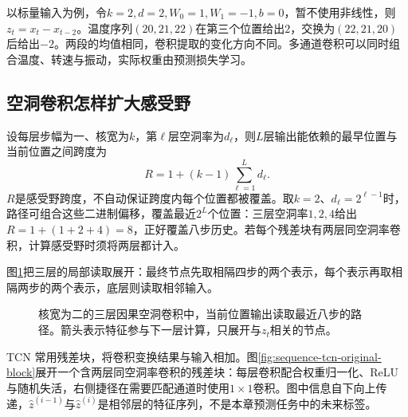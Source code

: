 以标量输入为例，令$k=2,d=2,W_0=1,W_1=-1,b=0$，暂不使用非线性，则$z_t=x_t-x_{t-2}$。温度序列$(20,21,22)$在第三个位置给出$2$，交换为$(22,21,20)$后给出$-2$。两段的均值相同，卷积提取的变化方向不同。多通道卷积可以同时组合温度、转速与振动，实际权重由预测损失学习。

\subsection{空洞卷积怎样扩大感受野}
设每层步幅为一、核宽为$k$，第$\ell$层空洞率为$d_\ell$，则$L$层输出能依赖的最早位置与当前位置之间跨度为
\begin{equation}
 R=1+(k-1)\sum_{\ell=1}^L d_\ell.
\end{equation}
$R$是感受野跨度，不自动保证跨度内每个位置都被覆盖。取$k=2$、$d_\ell=2^{\ell-1}$时，路径可组合这些二进制偏移，覆盖最近$2^L$个位置：三层空洞率$1,2,4$给出$R=1+(1+2+4)=8$，正好覆盖八步历史。若每个残差块有两层同空洞率卷积，计算感受野时须将两层都计入。

图\ref{fig:sequence-tcn-receptive}把三层的局部读取展开：最终节点先取相隔四步的两个表示，每个表示再取相隔两步的两个表示，底层则读取相邻输入。
\begin{figure}[htbp]
\centering
{}
\caption{核宽为二的三层因果空洞卷积中，当前位置输出读取最近八步的路径。箭头表示特征参与下一层计算，只展开与$z_t$相关的节点。}
\label{fig:sequence-tcn-receptive}
\end{figure}

TCN 常用残差块，将卷积变换结果与输入相加。图\ref{fig:sequence-tcn-original-block}展开一个含两层同空洞率卷积的残差块：每层卷积配合权重归一化、ReLU 与随机失活，右侧捷径在需要匹配通道时使用$1\times1$卷积。图中信息自下向上传递，$\hat z^{(i-1)}$与$\hat z^{(i)}$是相邻层的特征序列，不是本章预测任务中的未来标签。

